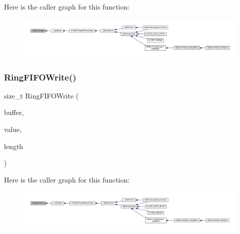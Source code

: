 Here is the caller graph for this function\+:
\nopagebreak
\begin{figure}[H]
\begin{center}
\leavevmode
\includegraphics[width=350pt]{ring-fifo_8c_a77fab9449f08873c068ca91015c0a675_icgraph}
\end{center}
\end{figure}
\mbox{\label{ring-fifo_8c_a1f62d2eb6ce5d30e2b8dde832b84768a}} 
\subsubsection{\texorpdfstring{Ring\+F\+I\+F\+O\+Write()}{RingFIFOWrite()}}
{\footnotesize\ttfamily size\+\_\+t Ring\+F\+I\+F\+O\+Write (\begin{DoxyParamCaption}\item[{struct Ring\+F\+I\+FO $\ast$}]{buffer,  }\item[{const void $\ast$}]{value,  }\item[{size\+\_\+t}]{length }\end{DoxyParamCaption})}

Here is the caller graph for this function\+:
\nopagebreak
\begin{figure}[H]
\begin{center}
\leavevmode
\includegraphics[width=350pt]{ring-fifo_8c_a1f62d2eb6ce5d30e2b8dde832b84768a_icgraph}
\end{center}
\end{figure}
